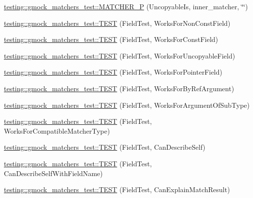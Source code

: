\begin{DoxyCompactItemize}
\item 
\mbox{\hyperlink{namespacetesting_1_1gmock__matchers__test_a55a8eba9beb33753baf7690d4cb9cd7e}{testing\+::gmock\+\_\+matchers\+\_\+test\+::\+M\+A\+T\+C\+H\+E\+R\+\_\+P}} (Uncopyable\+Is, inner\+\_\+matcher, \char`\"{}\char`\"{})
\item 
\mbox{\hyperlink{namespacetesting_1_1gmock__matchers__test_a57213a63527bbd66c024dd1cfafe92d1}{testing\+::gmock\+\_\+matchers\+\_\+test\+::\+T\+E\+ST}} (Field\+Test, Works\+For\+Non\+Const\+Field)
\item 
\mbox{\hyperlink{namespacetesting_1_1gmock__matchers__test_a065efc397a420d3dde87909b4a9a6285}{testing\+::gmock\+\_\+matchers\+\_\+test\+::\+T\+E\+ST}} (Field\+Test, Works\+For\+Const\+Field)
\item 
\mbox{\hyperlink{namespacetesting_1_1gmock__matchers__test_ac26d681f09865b0727ca32343d974907}{testing\+::gmock\+\_\+matchers\+\_\+test\+::\+T\+E\+ST}} (Field\+Test, Works\+For\+Uncopyable\+Field)
\item 
\mbox{\hyperlink{namespacetesting_1_1gmock__matchers__test_a56b1c75b98aaa5c9d3a6dec2d3ba30dc}{testing\+::gmock\+\_\+matchers\+\_\+test\+::\+T\+E\+ST}} (Field\+Test, Works\+For\+Pointer\+Field)
\item 
\mbox{\hyperlink{namespacetesting_1_1gmock__matchers__test_afcb890c159493e250477408a453b08d1}{testing\+::gmock\+\_\+matchers\+\_\+test\+::\+T\+E\+ST}} (Field\+Test, Works\+For\+By\+Ref\+Argument)
\item 
\mbox{\hyperlink{namespacetesting_1_1gmock__matchers__test_ae720452c3587433e26bea2ea7e91f8e6}{testing\+::gmock\+\_\+matchers\+\_\+test\+::\+T\+E\+ST}} (Field\+Test, Works\+For\+Argument\+Of\+Sub\+Type)
\item 
\mbox{\hyperlink{namespacetesting_1_1gmock__matchers__test_a27058ed7297742f08419bc5feb3ef687}{testing\+::gmock\+\_\+matchers\+\_\+test\+::\+T\+E\+ST}} (Field\+Test, Works\+For\+Compatible\+Matcher\+Type)
\item 
\mbox{\hyperlink{namespacetesting_1_1gmock__matchers__test_ac43583cb3c4221aa6bd0132c2cb3fed6}{testing\+::gmock\+\_\+matchers\+\_\+test\+::\+T\+E\+ST}} (Field\+Test, Can\+Describe\+Self)
\item 
\mbox{\hyperlink{namespacetesting_1_1gmock__matchers__test_a37d3ea6fde3a814c788ecddead6b9828}{testing\+::gmock\+\_\+matchers\+\_\+test\+::\+T\+E\+ST}} (Field\+Test, Can\+Describe\+Self\+With\+Field\+Name)
\item 
\mbox{\hyperlink{namespacetesting_1_1gmock__matchers__test_ae1279ce8e2a3a6c6f0d4dbe436c9da02}{testing\+::gmock\+\_\+matchers\+\_\+test\+::\+T\+E\+ST}} (Field\+Test, Can\+Explain\+Match\+Result)

\end{DoxyCompactItemize}
